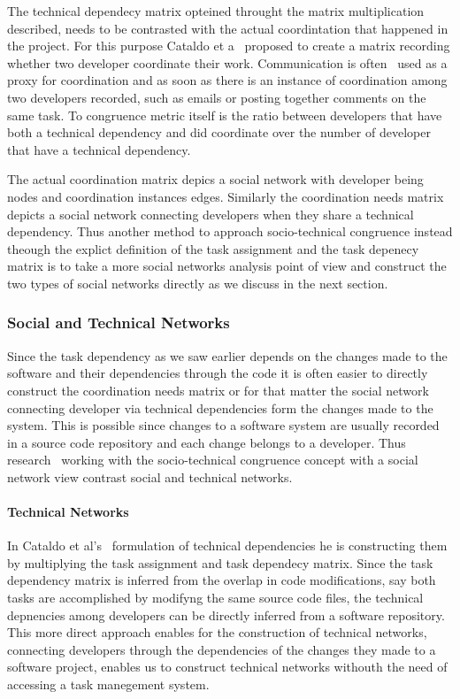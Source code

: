 The technical dependecy matrix opteined throught the matrix multiplication described, needs to be contrasted with the actual coordintation that happened in the project.
For this purpose Cataldo et a~\cite{cataldo:cscw:2006} proposed to create a matrix recording whether two developer coordinate their work.
Communication is often~\cite{} used as a proxy for coordination and as soon as there is an instance of coordination among two developers recorded, such as emails or posting together comments on the same task.
To congruence metric itself is the ratio between developers that have both a technical dependency and did coordinate over the number of developer that have a technical dependency.

The actual coordination matrix depics a social network with developer being nodes and coordination instances edges.
Similarly the coordination needs matrix depicts a social network connecting developers when they share a technical dependency.
Thus another method to approach socio-technical congruence instead theough the explict definition of the task assignment and the task depenecy matrix is to take a more social networks analysis point of view and construct the two types of social networks directly as we discuss in the next section.

\subsubsection{Social and Technical Networks}
Since the task dependency as we saw earlier depends on the changes made to the software and their dependencies through the code it is often easier to directly construct the coordination needs matrix or for that matter the social network connecting developer via technical dependencies form the changes made to the system.
This is possible since changes to a software system are usually recorded in a source code repository and each change belongs to a developer.
Thus research~\cite{} working with the socio-technical congruence concept with a social network view contrast social and technical networks.

\paragraph{Technical Networks}
In Cataldo et al's~\cite{cataldo:cscw:2006} formulation of technical dependencies he is constructing them by multiplying the task assignment and task dependecy matrix.
Since the task dependency matrix is inferred from the overlap in code modifications, say both tasks are accomplished by modifyng the same source code files, the technical depnencies among developers can be directly inferred from a software repository.
This more direct approach enables for the construction of technical networks, connecting developers through the dependencies of the changes they made to a software project, enables us to construct technical networks withouth the need of accessing a task manegement system.

